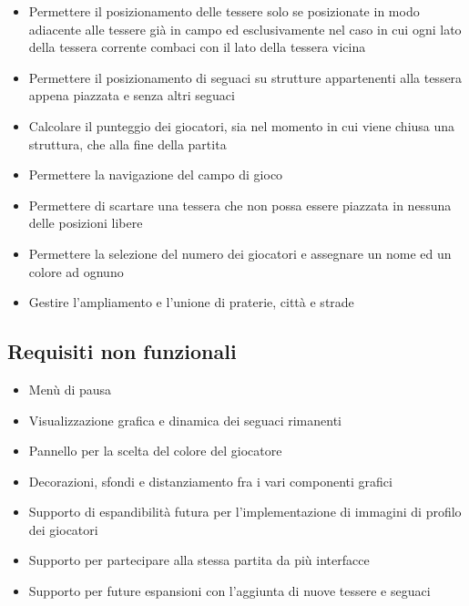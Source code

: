 \begin{itemize}
\item Permettere il posizionamento delle tessere solo se posizionate in modo adiacente alle tessere già in campo ed esclusivamente nel caso in cui ogni lato della tessera corrente combaci con il lato della tessera vicina
\item Permettere il posizionamento di seguaci su strutture appartenenti alla tessera appena piazzata e senza altri seguaci
\item Calcolare il punteggio dei giocatori, sia nel momento in cui viene chiusa una struttura, che alla fine della partita
\item Permettere la navigazione del campo di gioco
\item Permettere di scartare una tessera che non possa essere piazzata in nessuna delle posizioni libere
\item Permettere la selezione del numero dei giocatori e assegnare un nome ed un colore ad ognuno
\item Gestire l'ampliamento e l'unione di praterie, città e strade
\end{itemize}

\subsection*{Requisiti non funzionali}
\begin{itemize}
\item Menù di pausa
\end{itemize}
\begin{itemize}
\item Visualizzazione grafica e dinamica dei seguaci rimanenti 
\end{itemize}
\begin{itemize}
\item Pannello per la scelta del colore del giocatore
\end{itemize}
\begin{itemize}
\item Decorazioni, sfondi e distanziamento fra i vari componenti grafici
\end{itemize}
\begin{itemize}
\item Supporto di espandibilità futura per l'implementazione di immagini di profilo dei giocatori
\end{itemize}
\begin{itemize}
\item Supporto per partecipare alla stessa partita da più interfacce
\end{itemize}
\begin{itemize}
\item Supporto per future espansioni con l'aggiunta di nuove tessere e seguaci
\end{itemize}

